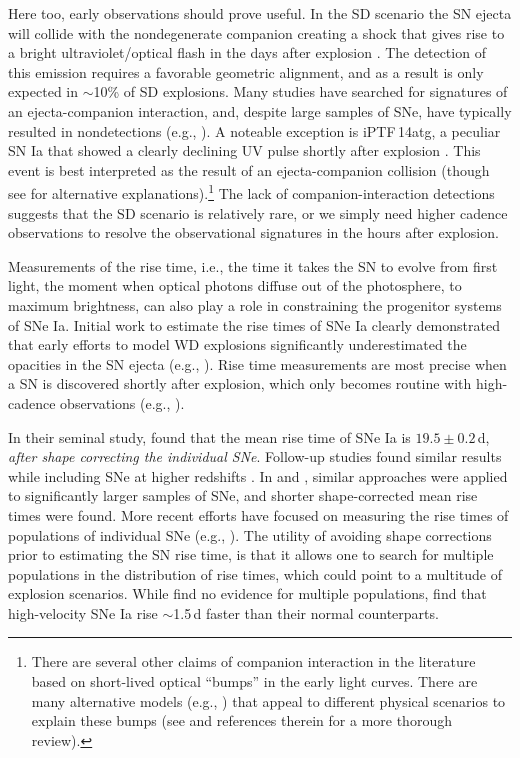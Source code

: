 \documentclass[twocolumn]{./aastex63}
\begin{document}
Here too, early observations should prove useful. In the SD scenario the SN
ejecta will collide with the nondegenerate companion creating a shock that gives
rise to a bright ultraviolet/optical flash in the days after explosion
\citep{Kasen10a}. The detection of this emission requires a favorable geometric
alignment, and as a result is only expected in $\sim$10\% of SD explosions. Many
studies have searched for signatures of an ejecta-companion interaction, and,
despite large samples of SNe, have typically resulted in nondetections (e.g.,
\citealt{Hayden10,Ganeshalingam11,Bloom12a,Zheng13,Goobar15,Olling15,Shappee16a}). A noteable exception is iPTF\,14atg, a peculiar SN Ia that showed a clearly declining
UV pulse shortly after explosion \citep{Cao15}. This event is best interpreted
as the result of an ejecta-companion collision (though see
\citealt{Kromer16,Noebauer17} for alternative explanations).\footnote{There are
several other claims of companion interaction in the literature based on
short-lived optical ``bumps'' in the early light curves. There are many
alternative models (e.g., \citealt{Dessart14,Piro16}) that appeal to different
physical scenarios to explain these bumps (see \citealt{Shappee16a,Miller18} and
references therein for a more thorough review).} The lack of
companion-interaction detections suggests that the SD scenario is relatively
rare, or we simply need higher cadence observations to resolve the observational
signatures in the hours after explosion.

Measurements of the rise time, i.e., the time it takes the SN to evolve from
first light, the moment when optical photons diffuse out of the photosphere, to
maximum brightness, can also play a role in constraining the progenitor systems
of SNe Ia. Initial work to estimate the rise times of SNe Ia clearly demonstrated
that early efforts to model WD explosions significantly underestimated the
opacities in the SN ejecta (e.g., \citealt{Riess99a}). Rise time measurements
are most precise when a SN is discovered shortly after explosion, which only
becomes routine with high-cadence observations (e.g., \citealt{Miller18}).

In their seminal study, \citet{Riess99a} found that the mean rise time of SNe Ia
is $19.5 \pm 0.2$\,d, \textit{after shape correcting the individual SNe}.
Follow-up studies found similar results while including SNe at higher redshifts
\citep{Conley06}. In \citet{Hayden10} and \citet{Ganeshalingam11}, similar
approaches were applied to significantly larger samples of SNe, and shorter
shape-corrected mean rise times were found. More recent efforts have focused on
measuring the rise times of populations of individual SNe (e.g.,
\citealt{Firth15,Zheng17a,Papadogiannakis19}). The utility of avoiding shape
corrections prior to estimating the SN rise time, is that it allows one to
search for multiple populations in the distribution of rise times, which could
point to a multitude of explosion scenarios. While \citet{Papadogiannakis19}
find no evidence for multiple populations, \citet{Ganeshalingam10} find that
high-velocity SNe Ia rise $\sim$1.5\,d faster than their normal counterparts.
\end{document}
